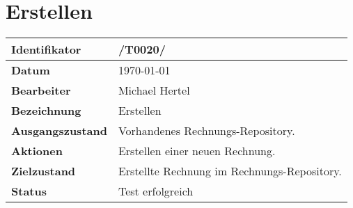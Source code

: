 
\section{Erstellen}

\renewcommand{\arraystretch}{1.5}

\begin{center}
 \begin{tabular}{|p{}|p{}|}
	\hline
	\textbf{Identifikator}  & /T0020/ \\
	\hline
	\textbf{Datum} & \today \\
	\hline
	\textbf{Bearbeiter} & Michael Hertel \\
	\hline
	\textbf{Bezeichnung} & Erstellen \\
	\hline
	\textbf{Ausgangszustand} &
		Vorhandenes Rechnungs-Repository. \\
	\hline
	\textbf{Aktionen} &
		Erstellen einer neuen Rechnung. \\
	\hline
	\textbf{Zielzustand} &
		Erstellte Rechnung im Rechnungs-Repository. \\
	\hline
	\textbf{Status} & Test erfolgreich \\
	\hline
 \end{tabular}
\end{center}
